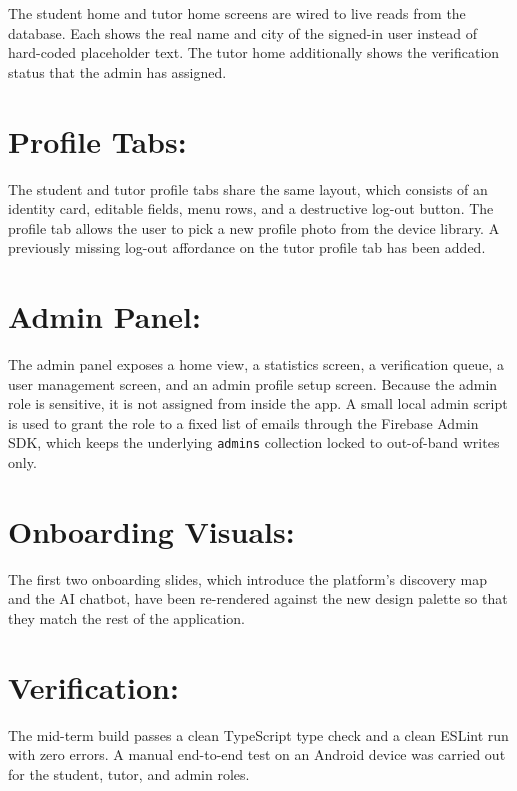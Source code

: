 \documentclass[12pt]{report}
\begin{document}
The student home and tutor home screens are wired to live
reads from the database. Each shows the real name and city
of the signed-in user instead of hard-coded placeholder
text. The tutor home additionally shows the verification
status that the admin has assigned.

\section{Profile Tabs:}

The student and tutor profile tabs share the same layout,
which consists of an identity card, editable fields, menu
rows, and a destructive log-out button. The profile tab
allows the user to pick a new profile photo from the device
library. A previously missing log-out affordance on the
tutor profile tab has been added.

\section{Admin Panel:}

The admin panel exposes a home view, a statistics screen, a
verification queue, a user management screen, and an admin
profile setup screen. Because the admin role is sensitive,
it is not assigned from inside the app. A small local admin
script is used to grant the role to a fixed list of emails
through the Firebase Admin SDK, which keeps the underlying
\texttt{admins} collection locked to out-of-band writes
only.

\section{Onboarding Visuals:}

The first two onboarding slides, which introduce the
platform's discovery map and the AI chatbot, have been
re-rendered against the new design palette so that they
match the rest of the application.

\section{Verification:}

The mid-term build passes a clean TypeScript type check and
a clean ESLint run with zero errors. A manual end-to-end
test on an Android device was carried out for the student,
tutor, and admin roles.

\end{document}
